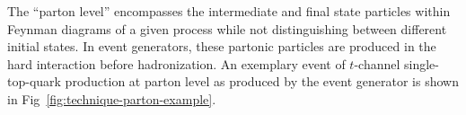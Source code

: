 The ``parton level'' encompasses the intermediate and final state particles within Feynman diagrams of a given process while not distinguishing between different initial states. In event generators, these partonic particles are produced in the hard interaction before hadronization. An exemplary event of $t$-channel single-top-quark production at parton level as produced by the \POWHEG event generator is shown in Fig~\ref{fig:technique-parton-example}. 


